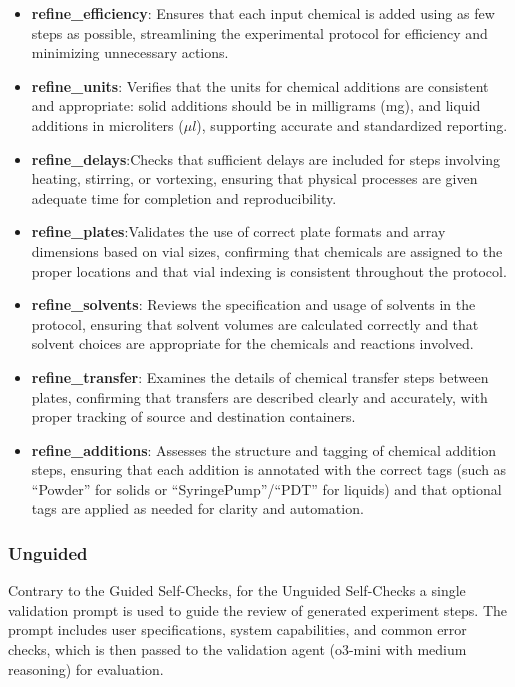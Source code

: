 \documentclass[sn-nature, twocolumn]{sn-jnl}%
\theoremstyle{thmstyleone}%
\theoremstyle{thmstyletwo}%
\theoremstyle{thmstylethree}%
\begin{document}
\begin{itemize}
\item \textbf{refine\_efficiency}: Ensures that each input chemical is added using as few steps as possible, streamlining the experimental protocol for efficiency and minimizing unnecessary actions.

\item \textbf{refine\_units}: Verifies that the units for chemical additions are consistent and appropriate: solid additions should be in milligrams (mg), and liquid additions in microliters ($\mu l$), supporting accurate and standardized reporting.

\item \textbf{refine\_delays}:Checks that sufficient delays are included for steps involving heating, stirring, or vortexing, ensuring that physical processes are given adequate time for completion and reproducibility.

\item \textbf{refine\_plates}:Validates the use of correct plate formats and array dimensions based on vial sizes, confirming that chemicals are assigned to the proper locations and that vial indexing is consistent throughout the protocol.

\item \textbf{refine\_solvents}: Reviews the specification and usage of solvents in the protocol, ensuring that solvent volumes are calculated correctly and that solvent choices are appropriate for the chemicals and reactions involved.

\item \textbf{refine\_transfer}: Examines the details of chemical transfer steps between plates, confirming that transfers are described clearly and accurately, with proper tracking of source and destination containers.

\item \textbf{refine\_additions}: Assesses the structure and tagging of chemical addition steps, ensuring that each addition is annotated with the correct tags (such as ``Powder'' for solids or ``SyringePump''/``PDT'' for liquids) and that optional tags are applied as needed for clarity and automation.
\end{itemize}

\subsubsection*{Unguided}
Contrary to the Guided Self-Checks, for the Unguided Self-Checks a single validation prompt is used to guide the review of generated experiment steps. The prompt includes user specifications, system capabilities, and common error checks, which is then passed to the validation agent (o3-mini with medium reasoning) for evaluation.
\end{document}
